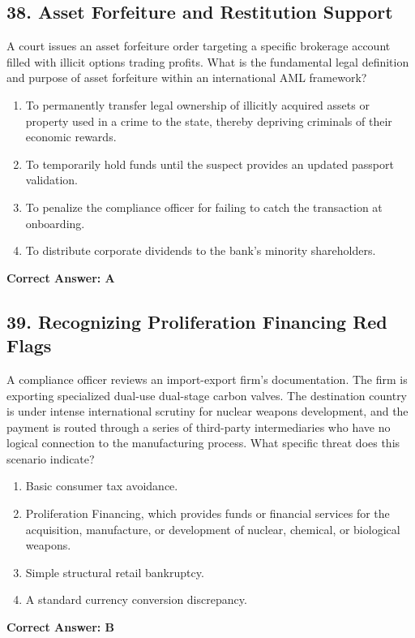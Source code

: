 \documentclass[11pt,a4paper]{article}
\begin{document}
	\subsection{38. Asset Forfeiture and Restitution Support}
	A court issues an asset forfeiture order targeting a specific brokerage account filled with illicit options trading profits. What is the fundamental legal definition and purpose of asset forfeiture within an international AML framework?
	\begin{enumerate}[label=\Alph*.]
		\item To permanently transfer legal ownership of illicitly acquired assets or property used in a crime to the state, thereby depriving criminals of their economic rewards.
		\item To temporarily hold funds until the suspect provides an updated passport validation.
		\item To penalize the compliance officer for failing to catch the transaction at onboarding.
		\item To distribute corporate dividends to the bank's minority shareholders.
	\end{enumerate}
	\textbf{Correct Answer: A}
	
	\subsection{39. Recognizing Proliferation Financing Red Flags}
	A compliance officer reviews an import-export firm's documentation. The firm is exporting specialized dual-use dual-stage carbon valves. The destination country is under intense international scrutiny for nuclear weapons development, and the payment is routed through a series of third-party intermediaries who have no logical connection to the manufacturing process. What specific threat does this scenario indicate?
	\begin{enumerate}[label=\Alph*.]
		\item Basic consumer tax avoidance.
		\item Proliferation Financing, which provides funds or financial services for the acquisition, manufacture, or development of nuclear, chemical, or biological weapons.
		\item Simple structural retail bankruptcy.
		\item A standard currency conversion discrepancy.
	\end{enumerate}
	\textbf{Correct Answer: B}
	
\end{document}
